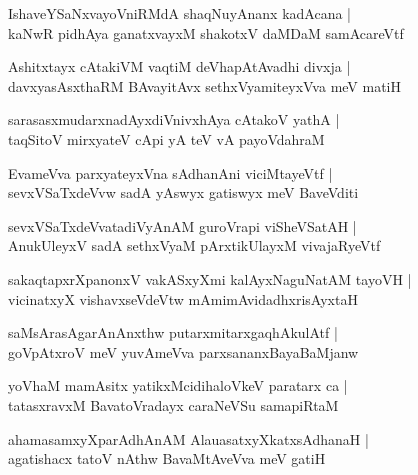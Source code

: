 \documentclass[twoside,12pt,openright]{book}
\newcounter{shloka}[chapter]
\begin{document}
\begin{shloka}%
IshaveYSaNxvayoVniRMdA shaqNuyAnanx kadAcana |\\
kaNwR pidhAya ganatxvayxM shakotxV daMDaM samAcareVtf 
\end{shloka}

\begin{shloka}%
Ashitxtayx cAtakiVM  vaqtiM deVhapAtAvadhi divxja |\\
davxyasAsxthaRM BAvayitAvx sethxVyamiteyxVva meV matiH 
\end{shloka}

\begin{shloka}%
sarasasxmudarxnadAyxdiVnivxhAya cAtakoV yathA |\\
taqSitoV mirxyateV cApi yA teV vA payoVdahraM 
\end{shloka}

\begin{shloka}%
EvameVva parxyateyxVna sAdhanAni viciMtayeVtf |\\
sevxVSaTxdeVvw sadA yAswyx gatiswyx meV BaveVditi
\end{shloka}

\begin{shloka}%
sevxVSaTxdeVvatadiVyAnAM guroVrapi viSheVSatAH |\\
AnukUleyxV sadA sethxVyaM pArxtikUlayxM vivajaRyeVtf 
\end{shloka}

\begin{shloka}%
sakaqtapxrXpanonxV vakASxyXmi kalAyxNaguNatAM tayoVH |\\
vicinatxyX vishavxseVdeVtw mAmimAvidadhxrisAyxtaH 
\end{shloka}

\begin{shloka}%
saMsArasAgarAnAnxthw putarxmitarxgaqhAkulAtf |\\
goVpAtxroV meV yuvAmeVva parxsananxBayaBaMjanw 
\end{shloka}

\begin{shloka}%
yoVhaM mamAsitx yatikxMcidihaloVkeV paratarx ca |\\
tatasxravxM BavatoVradayx caraNeVSu samapiRtaM 
\end{shloka}

\begin{shloka}%
ahamasamxyXparAdhAnAM AlauasatxyXkatxsAdhanaH |\\
agatishacx tatoV nAthw BavaMtAveVva meV gatiH 
\end{shloka}
\end{document}

